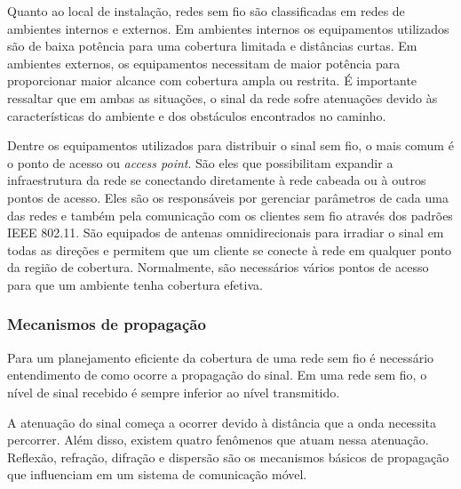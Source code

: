 \documentclass[tc,twoside]{iiufrgs}
\begin{document}
Quanto ao local de instalação, redes sem fio são classificadas em redes de ambientes internos e externos. Em ambientes internos os equipamentos utilizados são de baixa potência para uma cobertura limitada e distâncias curtas. Em ambientes externos, os equipamentos necessitam de maior potência para proporcionar maior alcance com cobertura ampla ou restrita. É importante ressaltar que em ambas as situações, o sinal da rede sofre atenuações devido às características do ambiente e dos obstáculos encontrados no caminho. \cite{rappaport2009comunicacoes} %

Dentre os equipamentos utilizados para distribuir o sinal sem fio, o mais comum é o ponto de acesso ou \textit{access point}. São eles que possibilitam expandir a infraestrutura da rede se conectando diretamente à rede cabeada ou à outros pontos de acesso. Eles são os responsáveis por gerenciar parâmetros de cada uma das redes e também pela comunicação com os clientes sem fio através dos padrões IEEE 802.11. São equipados de antenas omnidirecionais para irradiar o sinal em todas as direções e permitem que um cliente se conecte à rede em qualquer ponto da região de cobertura. Normalmente, são necessários vários pontos de acesso para que um ambiente tenha cobertura efetiva. \cite{sanches2005projetando} \cite{torres2015redes} %

\subsubsection{Mecanismos de propagação}

Para um planejamento eficiente da cobertura de uma rede sem fio é necessário entendimento de como ocorre a propagação do sinal. Em uma rede sem fio, o nível de sinal recebido é sempre inferior ao nível transmitido. \cite{rappaport2009comunicacoes} %

A atenuação do sinal começa a ocorrer devido à distância que a onda necessita percorrer. Além disso, existem quatro fenômenos que atuam nessa atenuação. Reflexão, refração, difração e dispersão são os mecanismos básicos de propagação que influenciam em um sistema de comunicação móvel. \cite{rappaport2009comunicacoes} %
\end{document}
